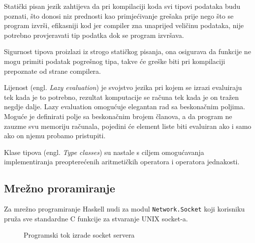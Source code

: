 Statički pisan jezik zahtijeva da pri kompilaciji koda svi tipovi podataka budu
poznati, što donosi niz prednosti kao primjećivanje grešaka prije nego što se
program izvrši, efikasniji kod jer compiler zna unaprijed veličinu podataka,
nije potrebno provjeravati tip podatka dok se program izvršava.

Sigurnost tipova proizlazi iz strogo statičkog pisanja, ona osigurava da
funkcije ne mogu primiti podatak pogrešnog tipa, takve će greške biti pri
kompilaciji prepoznate od strane compilera.

Lijenost (engl. \emph{Lazy evaluation}) je svojstvo jezika pri kojem se izrazi
evaluiraju tek kada je to potrebno, rezultat komputacije se računa tek kada je
on tražen negdje dalje. Lazy evaluation omogućuje elegantan rad sa beskonačnim
poljima. Moguće je definirati polje sa beskonačnim brojem članova, a da program
ne zauzme svu memoriju računala, pojedini će element liste biti evaluiran ako i
samo ako on njemu probamo pristupiti.

Klase tipova (engl. \emph{Type classes}) su nastale s ciljem omogućavanja
implementiranja preopterećenih aritmetičkih operatora i operatora jednakosti.

\subsection{Mrežno proramiranje}

Za mrežno programiranje Haskell nudi za modul
\texttt{Network.Socket} \cite{network_socket} koji korisniku
pruža sve standardne C funkcije za stvaranje UNIX socket-a.

\begin{figure}[H]
\centering
{}
\caption{Programski tok izrade socket servera}
\label{fig:server_creation}
\end{figure}

